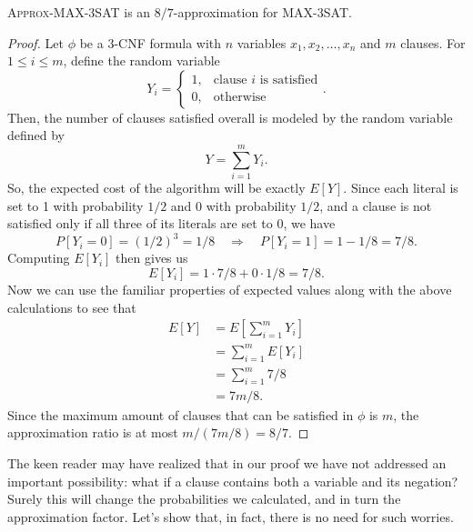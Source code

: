 \documentclass{article}
\newenvironment{theorem}[2][Theorem]{\begin{trivlist}
\item[\hskip \labelsep {\bfseries #1}\hskip \labelsep {\bfseries #2.}]}{\end{trivlist}}
\begin{document}
\begin{theorem}{2.1}{}
    \textsc{Approx-MAX-3SAT} is an $8/7$-approximation for MAX-3SAT.

    \begin{proof}
        Let $\phi$ be a 3-CNF formula with $n$ variables $x_1,x_2,\dots,x_n$ and $m$ clauses. For $1 \leq i \leq m$, define the random variable
        \[
        Y_i =
        \begin{cases}
            1, &\text{clause $i$ is satisfied}\\
            0, &\text{otherwise}
        \end{cases}.
        \]
        Then, the number of clauses satisfied overall is modeled by the random variable defined by
        \[
        Y = \sum_{i=1}^m Y_i.
        \]
        So, the expected cost of the algorithm will be exactly $E[Y]$. Since each literal is set to 1 with probability $1/2$ and 0 with probability $1/2$, and a clause is not satisfied only if all three of its literals are set to 0, we have
        \[
        P[Y_i = 0] = (1/2)^3 = 1/8 \quad \Longrightarrow \quad P[Y_i = 1] = 1 - 1/8 = 7/8.
        \]
        Computing $E[Y_i]$ then gives us
        \[
        E[Y_i] = 1 \cdot 7/8 + 0 \cdot 1/8 = 7/8.
        \]
        Now we can use the familiar properties of expected values along with the above calculations to see that
        \begin{align*}
            E[Y] &= E \left[ \sum_{i=1}^m Y_i \right]\\
            &= \sum_{i=1}^{m} E[Y_i]\\
            &= \sum_{i=1}^{m} 7/8\\
            &= 7m/8.
        \end{align*}
        Since the maximum amount of clauses that can be satisfied in $\phi$ is $m$, the approximation ratio is at most $m/(7m/8) = 8/7$.
    \end{proof}
\end{theorem}

\noindent The keen reader may have realized that in our proof we have not addressed an important possibility: what if a clause contains both a variable and its negation? Surely this will change the probabilities we calculated, and in turn the approximation factor. Let's show that, in fact, there is no need for such worries. 

\end{document}
